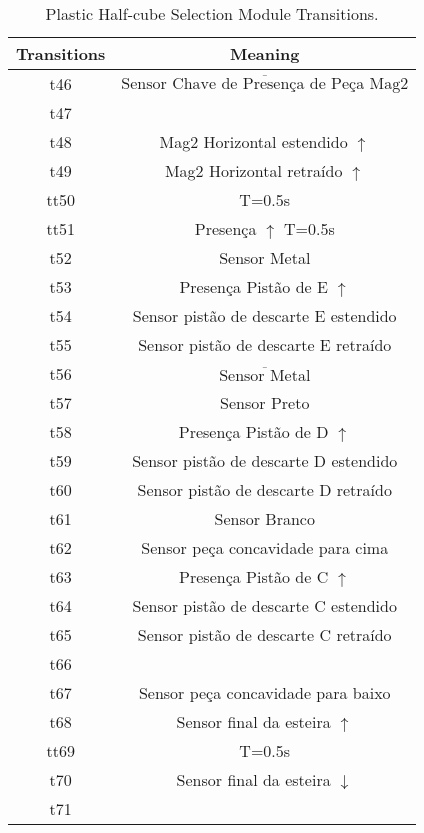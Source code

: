 \begin{table}[htbp]
\caption{Plastic Half-cube Selection Module Transitions.}
\centering
\begin{tabular}{cc}
Transitions & Meaning\\
\hline
t46 & \(\overline{\mbox{Sensor Chave de Presença de Peça Mag2}}\)\\
t47 & \\
t48 & Mag2 Horizontal estendido \(\uparrow\)\\
t49 & Mag2 Horizontal retraído \(\uparrow\)\\
tt50 & T=0.5s\\
tt51 & Presença \(\uparrow\) T=0.5s\\
t52 & Sensor Metal\\
t53 & Presença Pistão de E \(\uparrow\)\\
t54 & Sensor pistão de descarte E estendido\\
t55 & Sensor pistão de descarte E retraído\\
t56 & \(\overline{\mbox{Sensor Metal}}\)\\
t57 & Sensor Preto\\
t58 & Presença Pistão de D \(\uparrow\)\\
t59 & Sensor pistão de descarte D estendido\\
t60 & Sensor pistão de descarte D retraído\\
t61 & Sensor Branco\\
t62 & Sensor peça concavidade para cima\\
t63 & Presença Pistão de C \(\uparrow\)\\
t64 & Sensor pistão de descarte C estendido\\
t65 & Sensor pistão de descarte C retraído\\
t66 & \\
t67 & Sensor peça concavidade para baixo\\
t68 & Sensor final da esteira \(\uparrow\)\\
tt69 & T=0.5s\\
t70 & Sensor final da esteira \(\downarrow\)\\
t71 & \\
\end{tabular}
\end{table}
